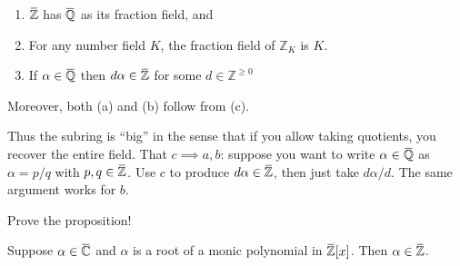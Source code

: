 \begin{proposition}[$\ff(\ZZ_K) = K$ ]

\envlist

\begin{enumerate}
\def\labelenumi{\alph{enumi}.}
\tightlist
\item
  \(\mkern 1.5mu\overline{\mkern-1.5mu{\mathbb{Z}}\mkern-1.5mu}\mkern 1.5mu\)
  has
  \(\mkern 1.5mu\overline{\mkern-1.5mu{\mathbb{Q}}\mkern-1.5mu}\mkern 1.5mu\)
  as its fraction field, and
\item
  For any number field \(K\), the fraction field of \({\mathbb{Z}}_K\)
  is \(K\).
\item
  If
  \(\alpha\in \mkern 1.5mu\overline{\mkern-1.5mu{\mathbb{Q}}\mkern-1.5mu}\mkern 1.5mu\)
  then
  \(d \alpha\in \mkern 1.5mu\overline{\mkern-1.5mu{\mathbb{Z}}\mkern-1.5mu}\mkern 1.5mu\)
  for some \(d\in {\mathbb{Z}}^{\geq 0}\)
\end{enumerate}

Moreover, both (a) and (b) follow from (c).

\end{proposition}

\begin{remark}

Thus the subring is ``big'' in the sense that if you allow taking
quotients, you recover the entire field. That \(c\implies a,b\): suppose
you want to write
\(\alpha \in \mkern 1.5mu\overline{\mkern-1.5mu{\mathbb{Q}}\mkern-1.5mu}\mkern 1.5mu\)
as \(\alpha=p/q\) with
\(p,q \in \mkern 1.5mu\overline{\mkern-1.5mu{\mathbb{Z}}\mkern-1.5mu}\mkern 1.5mu\).
Use \(c\) to produce
\(d\alpha\in \mkern 1.5mu\overline{\mkern-1.5mu{\mathbb{Z}}\mkern-1.5mu}\mkern 1.5mu\),
then just take \(d\alpha /d\). The same argument works for \(b\).

\end{remark}

\begin{exercise}[?]

Prove the proposition!

\end{exercise}

\begin{proposition}[?]

Suppose
\(\alpha\in \mkern 1.5mu\overline{\mkern-1.5mu{\mathbb{C}}\mkern-1.5mu}\mkern 1.5mu\)
and \(\alpha\) is a root of a monic polynomial in
\(\mkern 1.5mu\overline{\mkern-1.5mu{\mathbb{Z}}\mkern-1.5mu}\mkern 1.5mu [x]\).
Then
\(\alpha\in \mkern 1.5mu\overline{\mkern-1.5mu{\mathbb{Z}}\mkern-1.5mu}\mkern 1.5mu\).

\end{proposition}

